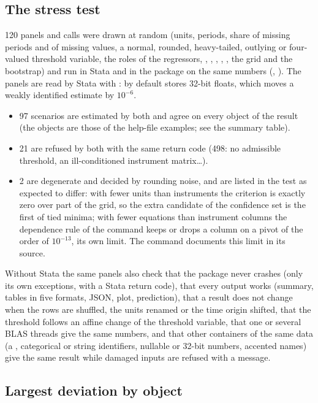 \documentclass[
  10.5pt,
  a4paper,
]{article}
\begin{document}
\subsection{The stress test}
120 panels and calls were drawn at random (units, periods, share of missing periods and of
missing values, a normal, rounded, heavy-tailed, outlying or four-valued threshold variable, the
roles of the regressors, , , , , , the grid and the
bootstrap) and run in Stata and in the package on the same numbers (,
). The panels are read by Stata with : by default
 stores 32-bit floats, which moves a weakly identified estimate by $10^{-6}$.
\begin{itemize}
\item 97 scenarios are estimated by both and agree on every object of the result
(the objects are those of the help-file examples; see the summary table).
\item 21 are refused by both with the same return code (498: no admissible threshold, an
ill-conditioned instrument matrix\ldots).
\item 2 are degenerate and decided by rounding noise, and are listed in the test as expected
to differ: with fewer units than instruments the criterion is exactly zero over part of the grid, so
the extra candidate of the confidence set is the first of tied minima; with fewer equations than
instrument columns the dependence rule of the command keeps or drops a column on a pivot of the order
of $10^{-13}$, its own limit. The command documents this limit in its source.
\end{itemize}
Without Stata the same panels also check that the package never crashes (only its own exceptions,
with a Stata return code), that every output works (summary, tables in five formats, JSON, plot,
prediction), that a result does not change when the rows are shuffled, the units renamed or the time
origin shifted, that the threshold follows an affine change of the threshold variable, that one or
several BLAS threads give the same numbers, and that other containers of the same data (a
, categorical or string identifiers, nullable or 32-bit numbers, accented names)
give the same result while damaged inputs are refused with a message.

\subsection{Largest deviation by object}
\end{document}
